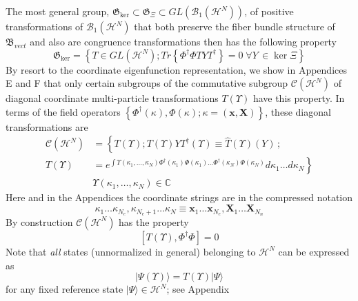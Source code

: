 \documentclass[aps,preprint]{revtex4}%
\begin{document}
The most general group, $\mathfrak{G}_{\ker}\subset\mathfrak{G}_{\Xi}\subset
GL\left(  \mathcal{B}_{1}\left(  \mathcal{H}^{N}\right)  \right)  $, of
positive transformations of $\mathcal{B}_{1}\left(  \mathcal{H}^{N}\right)  $
that both preserve the fiber bundle structure of $\mathfrak{B}_{vect}$ and
also are congruence transformations then has the following property
\begin{equation}
\mathfrak{G}_{\ker}=\left\{  T\in GL(\mathcal{H}^{N});Tr\left\{  \Phi
^{\dagger}\Phi TYT^{\dagger}\right\}  =0\;\forall Y\,\in\ker\Xi\text{
}\right\}  \label{GLkerXi}%
\end{equation}
By resort to the coordinate eigenfunction representation, we show in
Appendices E and F that only certain subgroups of the commutative subgroup
$\mathcal{C}(\mathcal{H}^{N})$ of diagonal coordinate multi-particle
transformations $T(\Upsilon)$ have this property. In terms of the field
operators $\left\{  \Phi^{\dagger}\left(  \kappa\right)  ,\Phi\left(
\kappa\right)  ;\kappa=\left(  \mathbf{x},\mathbf{X}\right)  \right\}  $,
these diagonal transformations are
\begin{align}
\mathcal{C}(\mathcal{H}^{N})  &  =\left\{  T(\Upsilon);T(\Upsilon)YT^{\dagger
}(\Upsilon)\equiv\widehat{T}(\Upsilon)(Y)\right.  \,;\nonumber\\
T(\Upsilon)  &  =\left.  e^{\int\Upsilon(\kappa_{1},\ldots,\kappa_{N}%
)\Phi^{\dagger}(\kappa_{1})\Phi(\kappa_{1})\ldots\Phi^{\dagger}(\kappa
_{N})\Phi(\kappa_{N})}d\kappa_{1}\ldots d\kappa_{N}\right\} \nonumber\\
&  \Upsilon(\kappa_{1},\ldots,\kappa_{N})\in\mathbb{C}%
\end{align}
Here and in the Appendices the coordinate strings are in the compressed
notation
\begin{equation}
\kappa_{1}\ldots\kappa_{N_{e}},\kappa_{N_{e}+1}\ldots\kappa_{N}\equiv
\mathbf{x}_{1}\ldots\mathbf{x}_{N_{e}},\mathbf{X}_{1}\ldots\mathbf{X}_{N_{n}}
\label{compressed}%
\end{equation}
By construction $\mathcal{C}(\mathcal{H}^{N})$ has the property
\begin{equation}
\left[  T(\Upsilon),\Phi^{\dagger}\Phi\right]  =0
\end{equation}
Note that \emph{all} states (unnormalized in general) belonging to
$\mathcal{H}^{N}$ can be expressed as
\begin{equation}
|\Psi(\Upsilon)\rangle=T(\Upsilon)|\Psi\rangle
\end{equation}
for any fixed reference state $|\Psi\rangle\in\mathcal{H}^{N}$; see Appendix
\end{document}
